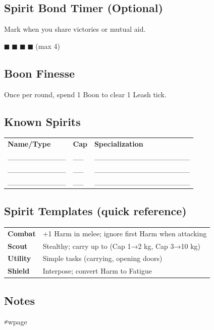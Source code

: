 \documentclass[11pt]{article}
\begin{document}
\subsection*{Spirit Bond Timer (Optional)}
Mark when you share victories or mutual aid.
\begin{center}
$■$ $■$ $■$ $■$ (max 4)
\end{center}

\subsection*{Boon Finesse}
Once per round, spend 1 Boon to clear 1 Leash tick.

\subsection*{Known Spirits}
\small
\begin{tabularx}{\textwidth}{p{3cm} p{2cm} X}
\textbf{Name/Type} & \textbf{Cap} & \textbf{Specialization} \\
___________ & __ & __________________ \\
___________ & __ & __________________ \\
___________ & __ & __________________ \\
\end{tabularx}
\normalsize

\subsection*{Spirit Templates (quick reference)}
\small
\begin{tabularx}{\textwidth}{p{2.5cm} X}
\textbf{Combat} & +1 Harm in melee; ignore first Harm when attacking \\
\textbf{Scout} & Stealthy; carry up to (Cap 1→2 kg, Cap 3→10 kg) \\
\textbf{Utility} & Simple tasks (carrying, opening doors) \\
\textbf{Shield} & Interpose; convert Harm to Fatigue \\
\end{tabularx}

\subsection*{Notes}
\vspace{5cm}
≠wpage

\end{document}
